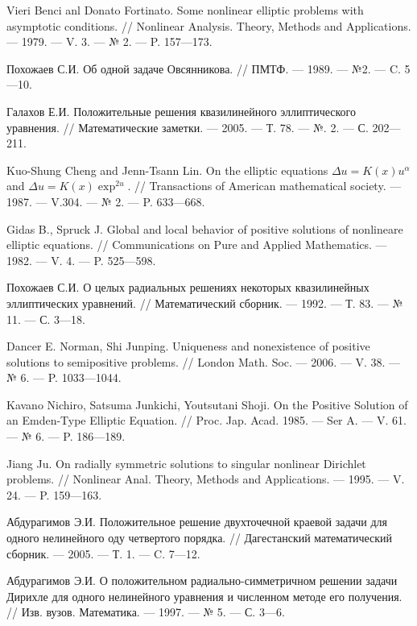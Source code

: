 \begin{thebibliography}{111}
Vieri Benci anl Donato Fortinato. Some nonlinear elliptic problems
with asymptotic conditions. // Nonlinear Analysis. Theory, Methods
and Applications. --- 1979. --- V. 3. --- № 2. --- P. 157---173.


Похожаев С.И. Об одной задаче Овсянникова. // ПМТФ. --- 1989. --- №2. --- C. 5---10.


Галахов Е.И. Положительные решения квазилинейного эллиптического
уравнения. // Математические заметки. --- 2005. --- Т. 78. --- №. 2. --- С. 202---211.


Kuo-Shung Cheng and Jenn-Tsann Lin. On the elliptic equations
$ \Delta u=K(x)u^{\alpha} $   and $ \Delta u=K(x)\exp^{2u} $. // Transactions of American mathematical society. --- 1987. --- V.304. --- № 2. --- P. 633---668.


Gidas B., Spruck  J.  Global and local behavior of positive solutions
of nonlineare elliptic equations. //  Communications on Pure and
Applied Mathematics. --- 1982. --- V. 4. --- P. 525---598.


Похожаев С.И. О целых радиальных решениях некоторых квазилинейных
эллиптических уравнений. // Математический сборник. --- 1992. --- Т. 83. --- № 11. --- С. 3---18.


Dancer E. Norman, Shi Junping. Uniqueness and nonexistence of
positive solutions to semipositive problems. // London Math. Soc. --- 2006. --- V. 38. --- № 6. --- P. 1033---1044.


Kavano Nichiro, Satsuma Junkichi, Youtsutani Shoji. On the Positive
Solution of an Emden-Type Elliptic Equation. // Proc. Jap. Acad.
1985. --- Ser A. --- V. 61. --- № 6. --- P. 186---189.


Jiang Ju. On radially  symmetric solutions to singular nonlinear
Dirichlet problems. // Nonlinear Anal. Theory, Methods and
Applications. --- 1995. --- V. 24. --- P. 159---163.


Абдурагимов Э.И. Положительное решение двухточечной краевой задачи для
одного нелинейного оду четвертого порядка. // Дагестанский
математический сборник. --- 2005. --- Т. 1. --- C. 7---12.


Абдурагимов Э.И. О положительном радиально-симметричном решении
 задачи Дирихле для одного нелинейного  уравнения и численном методе
 его получения. // Изв. вузов. Математика. --- 1997. --- № 5. --- С. 3---6.



\end{thebibliography}
